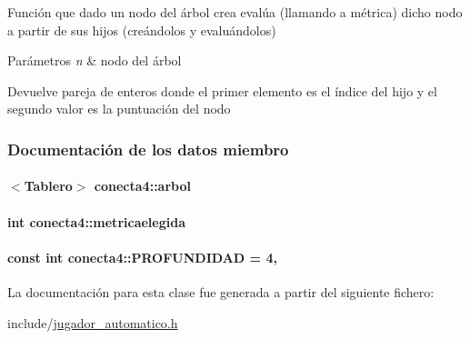 Función que dado un nodo del árbol crea evalúa (llamando a métrica) dicho nodo a partir de sus hijos (creándolos y evaluándolos) 


\begin{DoxyParams}{Parámetros}
{\em n} & nodo del árbol \\
\hline
\end{DoxyParams}
\begin{DoxyReturn}{Devuelve}
pareja de enteros donde el primer elemento es el índice del hijo y el segundo valor es la puntuación del nodo 
\end{DoxyReturn}


\subsubsection{Documentación de los datos miembro}
\hypertarget{classconecta4_ad43e13dbc348258afc4995fa5c3239a6}{
\paragraph[{arbol}]{$<${\bf Tablero}$>$ conecta4\-::arbol\hspace{0.3cm}{\ttfamily [private]}}}\label{classconecta4_ad43e13dbc348258afc4995fa5c3239a6}
\hypertarget{classconecta4_a864ebc749eeed1ce602f2244c11bf85c}{
\paragraph[{metricaelegida}]{\setlength{\rightskip}{0pt plus 5cm}int conecta4\-::metricaelegida\hspace{0.3cm}{\ttfamily [private]}}}\label{classconecta4_a864ebc749eeed1ce602f2244c11bf85c}
\hypertarget{classconecta4_abcb731b830e10e986e26775961c33e88}{
\paragraph[{P\-R\-O\-F\-U\-N\-D\-I\-D\-A\-D}]{\setlength{\rightskip}{0pt plus 5cm}const int conecta4\-::\-P\-R\-O\-F\-U\-N\-D\-I\-D\-A\-D = 4\hspace{0.3cm}{\ttfamily [static]}, {\ttfamily [private]}}}\label{classconecta4_abcb731b830e10e986e26775961c33e88}


La documentación para esta clase fue generada a partir del siguiente fichero\-:\begin{DoxyCompactItemize}
\item 
include/\hyperlink{jugador__automatico_8h}{jugador\-\_\-automatico.\-h}\end{DoxyCompactItemize}
